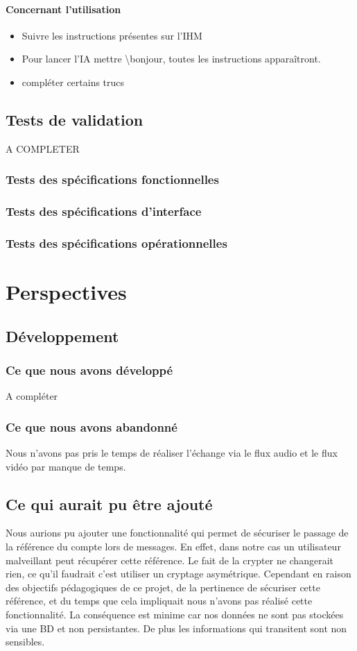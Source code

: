 \documentclass[11pt,dvipsnames,svgnames]{report}
\begin{document}
\subsubsection{Concernant l'utilisation}
\begin{itemize}
\item Suivre les instructions présentes sur l'IHM
\item Pour lancer l'IA mettre \textbackslash bonjour, toutes les instructions apparaîtront.
\item compléter certains trucs
\end{itemize}

\section{Tests de validation}
A COMPLETER
\subsection{Tests des spécifications fonctionnelles}
\subsection{Tests des spécifications d'interface}
\subsection{Tests des spécifications opérationnelles}

\chapter{Perspectives}
\section{Développement}
\subsection{Ce que nous avons développé}
A compléter 
\subsection{Ce que nous avons abandonné}
Nous n'avons pas pris le temps de réaliser l'échange via le flux audio et le flux vidéo par manque de temps.
\section{Ce qui aurait pu être ajouté}
Nous aurions pu ajouter une fonctionnalité qui permet de sécuriser le passage de la référence du compte lors de messages. En effet, dans notre cas un utilisateur malveillant peut récupérer cette référence. Le fait de la crypter ne changerait rien, ce qu'il faudrait c'est utiliser un cryptage asymétrique. Cependant en raison des objectifs pédagogiques de ce projet, de la pertinence de sécuriser cette référence, et du temps que cela impliquait nous n'avons pas réalisé cette fonctionnalité. La conséquence est minime car nos données ne sont pas stockées via une BD et non persistantes. De plus les informations qui transitent sont non sensibles. 
\end{document}
